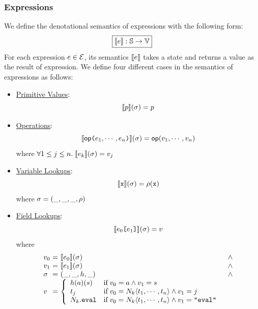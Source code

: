\documentclass[10pt,conference]{IEEEtran}
\begin{document}
\subsubsection{Expressions} We define the denotational semantics of expressions with
the following form:
\[
  \framebox{$\sem{\expr}: \stset \rightarrow \valset$}
\]
For each expression $e \in \mathcal{E}$, its semantics $\llbracket{e}\rrbracket$ takes a
state and returns a value as the result of expression. We define four different
cases in the semantics of expressions as
follows:
\begin{itemize}
  \item \underline{Primitive Values}:
    \[
      \llbracket{p}\rrbracket(\sigma) = p
    \]

  \item \underline{Operations}:
    \[
      \sem{\op \kwrl \expr_1, \cdots, \expr_n \kwrr}(\st) =
      \op(\val_1, \cdots, \val_n)
    \]
    where $\forall 1 \leq j \leq n. \; \llbracket{e_k}\rrbracket(\sigma) = v_j$

  \item \underline{Variable Lookups}:
    \[
      \sem{\varx}(\st) = \env(\varx)
    \]
    where $\sigma = (\_, \_, \_, \rho)$

  \item \underline{Field Lookups}:
    \[
      \sem{\expr_0 \kwsl \expr_1 \kwsr}(\st) = \val
    \]
    where
    \[
      \begin{array}{l@{~}c@{~}ll}
        \val_0 &=& \sem{\expr_0}(\st) &\wedge\\
        \val_1 &=& \sem{\expr_1}(\st) &\wedge\\
        \st &=& (\_, \_, \heap, \_) &\wedge\\
        \val &=& \left\{
          \begin{array}{ll}
            \heap(\addr)(\str)
            & \text{if} \; \val_0 = \addr \wedge \val_1 = \str\\

            \tree_j
            & \text{if} \; \val_0 = \nt_k \langle \tree_1, \cdots, \tree_n
            \rangle \wedge \val_1 = j\\

            \nt_k.\eval
            & \text{if} \; \val_0 = \nt_k \langle \tree_1, \cdots, \tree_n
            \rangle \wedge \val_1 = \code{"eval"}\\
          \end{array}
        \right.\\
      \end{array}
    \]
\end{itemize}
\end{document}
